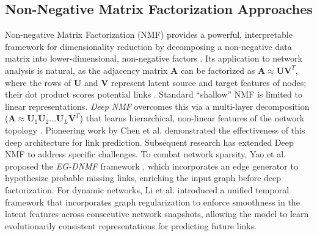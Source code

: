 \documentclass[pdflatex,sn-mathphys-num]{sn-jnl}%
\theoremstyle{thmstyleone}%
\theoremstyle{thmstyletwo}%
\theoremstyle{thmstylethree}%
\theoremstyle{plain} %
\theoremstyle{definition} %
\theoremstyle{remark} %
\theoremstyle{plain} %
\begin{document}
\subsection{Non-Negative Matrix Factorization Approaches}
Non-negative Matrix Factorization (NMF) provides a powerful, interpretable framework for dimensionality reduction by decomposing a non-negative data matrix into lower-dimensional, non-negative factors \cite{lee1999learning}. 
Its application to network analysis is natural, as the adjacency matrix $\mathbf{A}$ can be factorized as $\mathbf{A} \approx \mathbf{U}\mathbf{V}^T$, where the rows of $\mathbf{U}$ and $\mathbf{V}$ represent latent source and target features of nodes; their dot product scores potential links \cite{wang2017nonnegative}. 
Standard ``shallow'' NMF is limited to linear representations. 
\textit{Deep NMF} overcomes this via a multi-layer decomposition ($\mathbf{A} \approx \mathbf{U}_1 \mathbf{U}_2 \dots \mathbf{U}_L \mathbf{V}^T$) that learns hierarchical, non-linear features of the network topology \cite{trigeorgis2014deep}. 
Pioneering work by Chen et al. \cite{chen2022deep} demonstrated the effectiveness of this deep architecture for link prediction.
Subsequent research has extended Deep NMF to address specific challenges. 
To combat network sparsity, Yao et al. proposed the \textit{EG-DNMF} framework \cite{yao2024deep}, which incorporates an edge generator to hypothesize probable missing links, enriching the input graph before deep factorization. 
For dynamic networks, Li et al. \cite{li2025unified} introduced a unified temporal framework that incorporates graph regularization to enforce smoothness in the latent features across consecutive network snapshots, allowing the model to learn evolutionarily consistent representations for predicting future links.

\end{document}

